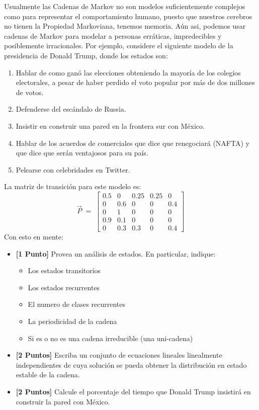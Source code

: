 \documentclass[ a4paper, twoside, 11pt]{article}
\begin{document}
\begin{problem}
Usualmente las Cadenas de Markov no son modelos suficientemente complejos como para representar el comportamiento humano, puesto que nuestros cerebros no tienen la Propiedad Markoviana, \ie tenemos memoria. A\'un asi, podemos usar cadenas de Markov para modelar a personas err\'aticas, impredecibles y posiblemente irracionales. Por ejemplo, considere el siguiente modelo de la presidencia de Donald Trump, donde los estados son: 
\begin{enumerate}
\item Hablar de como gan\'o las elecciones obteniendo la mayor\'ia de los colegios electorales, \linebreak a pesar de haber perdido el voto popular por m\'as de dos millones de votos. 
\item Defenderse del esc\'andalo de Russia. 
\item Insistir en construir una pared en la frontera sur con M\'exico. 
\item Hablar de los acuerdos de comerciales que dice que renegociar\'a (\eg NAFTA) y que dice que ser\'an ventajosos para su pa\'is. 
\item Pelearse con celebridades en Twitter. 
\end{enumerate}
La matriz de transici\'on para este modelo es: 
\[
\vec{P} \; = \; 
\left[
\begin{array}{ccccc}
0.5 & 0 & 0.25 & 0.25 & 0 \\
0 & 0.6 & 0 & 0 & 0.4 \\
0 & 1 & 0 & 0 & 0 \\
0.9 & 0.1 & 0 & 0 & 0 \\
0 & 0.3 & 0.3 & 0 & 0.4
\end{array}
\right]
\]
Con esto en mente: 
\begin{itemize}
\item \textbf{[1 Punto]} Provea un an\'alisis de estados. En particular, indique: 
\begin{itemize}
\item Los estados transitorios
\item Los estados recurrentes
\item El numero de clases recurrentes
\item La periodicidad de la cadena
\item Si es o no es una cadena irreducible (\ie una uni-cadena)
\end{itemize}
\item \textbf{[2 Puntos]} Escriba un conjunto de ecuaciones lineales linealmente independientes de cuya soluci\'on se pueda obtener la distribuci\'on en estado estable de la cadena. 
\item \textbf{[2 Puntos]} Calcule el porcentaje del tiempo que Donald Trump insistir\'a en construir la pared con M\'exico. 
\end{itemize}



\end{problem}
\vspace{\baselineskip}
\end{document}
